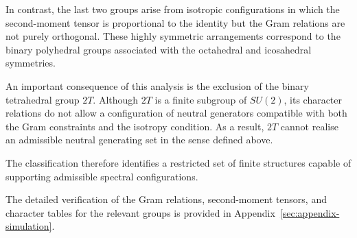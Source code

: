   In contrast, the last two groups arise from isotropic configurations in which
  the second-moment tensor is proportional to the identity but the Gram
  relations are not purely orthogonal.
  These highly symmetric arrangements correspond to the binary polyhedral
  groups associated with the octahedral and icosahedral symmetries.

  An important consequence of this analysis is the exclusion of the binary
  tetrahedral group $2T$.
  Although $2T$ is a finite subgroup of $SU(2)$, its character relations do not
  allow a configuration of neutral generators compatible with both the Gram
  constraints and the isotropy condition.
  As a result, $2T$ cannot realise an admissible neutral generating set in the
  sense defined above.

  The classification therefore identifies a restricted set of finite
  structures capable of supporting admissible spectral configurations.

  The detailed verification of the Gram relations, second-moment tensors, and
  character tables for the relevant groups is provided in
  Appendix~\ref{sec:appendix-simulation}.
